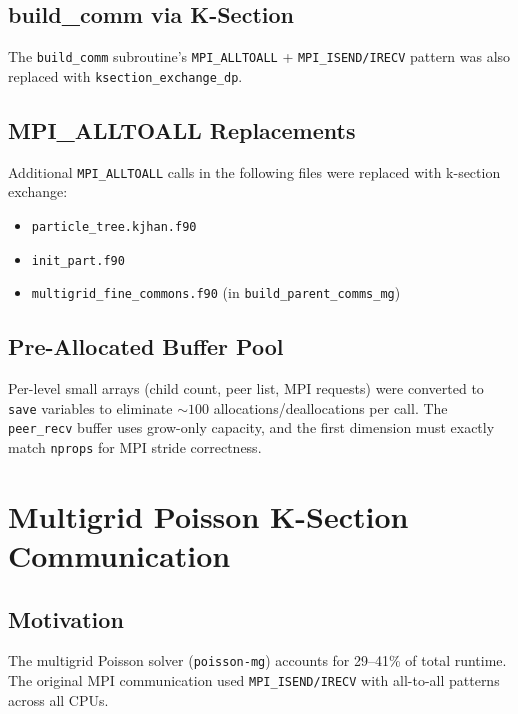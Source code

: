 \documentclass[11pt,fleqn]{book}
\begin{document}
\section{build\_comm via K-Section}

The \texttt{build\_comm} subroutine's \texttt{MPI\_ALLTOALL} + \texttt{MPI\_ISEND/IRECV} pattern was also replaced with \texttt{ksection\_exchange\_dp}.

\section{MPI\_ALLTOALL Replacements}

Additional \texttt{MPI\_ALLTOALL} calls in the following files were replaced with k-section exchange:
\begin{itemize}[leftmargin=2em]
  \item \texttt{particle\_tree.kjhan.f90}
  \item \texttt{init\_part.f90}
  \item \texttt{multigrid\_fine\_commons.f90} (in \texttt{build\_parent\_comms\_mg})
\end{itemize}

\section{Pre-Allocated Buffer Pool}

Per-level small arrays (child count, peer list, MPI requests) were converted to \texttt{save} variables to eliminate ${\sim}100$ allocations/deallocations per call. The \texttt{peer\_recv} buffer uses grow-only capacity, and the first dimension must exactly match \texttt{nprops} for MPI stride correctness.


\chapter{Multigrid Poisson K-Section Communication}

\section{Motivation}

The multigrid Poisson solver (\texttt{poisson-mg}) accounts for 29--41\% of total runtime. The original MPI communication used \texttt{MPI\_ISEND/IRECV} with all-to-all patterns across all CPUs.
\end{document}
